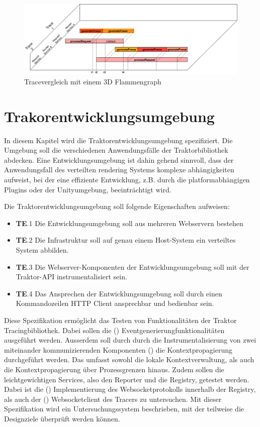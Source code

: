 \begin{figure}[!ht]
	\centering
	\includegraphics[scale=0.4]{img/Design/3D-Flammengraph-Vergleich.png}
	\caption[Darstellungsbeispiel eines Tracevergleich mit einem 3D Flammengraph]{ Tracevergleich mit einem 3D Flammengraph}
	\label{fig:3D-Flammengraph-Vergleich}
\end{figure}

\section{Trakorentwicklungsumgebung}
\label{section:Trakorentwicklungsumgebung}
In diesem Kapitel wird die Traktorentwicklungsumgebung spezifiziert. Die Umgebung soll die verschiedenen Anwendungsfälle der Traktorbibliothek abdecken. Eine Entwicklungsumgebung ist dahin gehend sinnvoll, dass der Anwendungsfall des verteilten rendering Systems komplexe abhängigkeiten aufweist, bei der eine effiziente Entwicklung, z.B. durch die platformabhängigen Plugins oder der Unityumgebung, beeinträchtigt wird.

Die Traktorentwicklungsumgebung soll folgende Eigenschaften aufweisen:

\begin{itemize}
	\item \textbf{TE}.1 Die Entwicklungsumgebung soll aus mehreren Webservern bestehen
	\item  \textbf{TE}.2 Die Infrastruktur soll auf genau einem Host-System ein verteiltes System abbilden.
	\item  \textbf{TE}.3 Die Webserver-Komponenten der Entwicklungsumgebung soll mit der Traktor-API instrumentalisiert sein.
	\item  \textbf{TE}.4 Das Ansprechen der Entwicklungsumgebung soll durch einen Kommandozeilen HTTP Client ansprechbar und bedienbar sein.
\end{itemize}

Diese Spezifikation ermöglicht das Testen von Funktionalitäten der Traktor Tracingbibliothek. Dabei sollen die () Eventgenerierungfunktionalitäten ausgeführt werden. Ausserdem soll durch durch die Instrumentalisierung von zwei miteinander kommunizierenden Komponenten () die Kontextpropagierung durchgeführt werden. Das umfasst sowohl die lokale Kontextverwaltung, als auch die Kontextpropagierung über Prozessgrenzen hinaus. Zudem sollen die leichtgewichtigen Services, also den Reporter und die Registry, getestet werden. Dabei ist die () Implementierung des Websocketprotokolls innerhalb der Registry, als auch der () Websocketclient des Tracers zu untersuchen. Mit dieser Spezifikation wird ein Untersuchungssystem beschrieben, mit der teilweise die Designziele überprüft werden können. 
